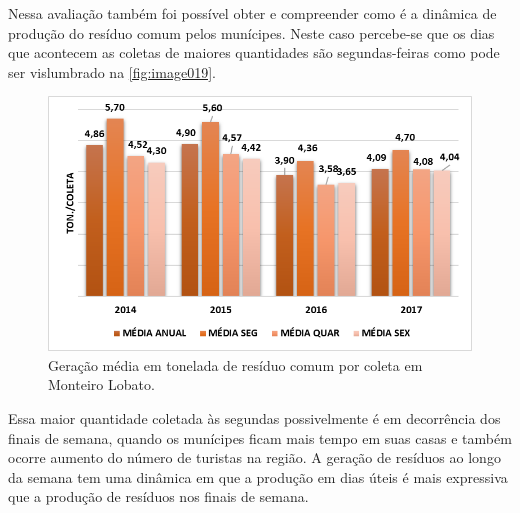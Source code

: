 	
	Nessa avaliação também foi possível obter e compreender como é a dinâmica de produção do resíduo comum pelos munícipes. Neste caso percebe-se que os dias que acontecem as coletas de maiores quantidades são segundas-feiras como pode ser vislumbrado na \autoref{fig:image019}.
	
	\begin{figure}
		\centering
		\includegraphics[width=0.7\linewidth]{produtos/prodtres/image019}
		\caption{Geração média em tonelada de resíduo comum por coleta em Monteiro Lobato.}
		\label{fig:image019}
	\end{figure}
	
	Essa maior quantidade coletada às segundas possivelmente é em decorrência dos finais de semana, quando os munícipes ficam mais tempo em suas casas e também ocorre aumento do número de turistas na região. A geração de resíduos ao longo da semana tem uma dinâmica em que a produção em dias úteis é mais expressiva que a produção de resíduos nos finais de semana.
	
